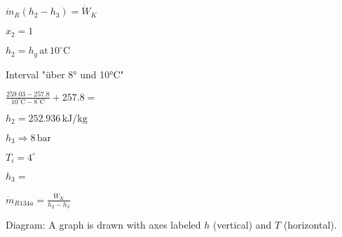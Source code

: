 \( \dot{m}_R (h_2 - h_3) = \dot{W}_K \)  

\( x_2 = 1 \)  

\( h_2 = h_g \, \text{at} \, 10^\circ \text{C} \)  

Interval "über 8° und 10°C"  

\( \frac{259.03 - 257.8}{10^\circ \text{C} - 8^\circ \text{C}} + 257.8 = \)  

\( h_2 = 252.936 \, \text{kJ/kg} \)  

\( h_3 \Rightarrow 8 \, \text{bar} \)  

\( T_i = 4^\circ \)  

\( h_3 = \)  

\( \dot{m}_{R134a} = \frac{\dot{W}_K}{h_2 - h_3} \)  

Diagram: A graph is drawn with axes labeled \( h \) (vertical) and \( T \) (horizontal).